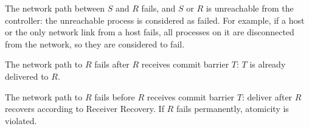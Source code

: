 \begin{ecompact}
	\item The network path between $S$ and $R$ fails, and $S$ or $R$ is unreachable from the controller: the unreachable process is considered as failed. For example, if a host or the only network link from a host fails, all processes on it are disconnected from the network, so they are considered to fail.
	\item The network path to $R$ fails after $R$ receives commit barrier $T$: $T$ is already delivered to $R$.
	\item The network path to $R$ fails before $R$ receives commit barrier $T$: deliver after $R$ recovers according to Receiver Recovery. If $R$ fails permanently, atomicity is violated.
\end{ecompact}

\iffalse
\newtheorem{theorem}{Theorem}
\theoremstyle{definition}
\newtheorem{definition}{Definition}
\newtheorem{property}{Property}
\newtheorem*{assump}{Assumption}
\newtheorem*{notation}{Notation}
\newtheorem{lemma}{Lemma}
\theoremstyle{remark}
\newtheorem*{rem}{Remark}
\newtheorem*{conclusion}{Conclusion}
\newtheorem*{note}{Note}
